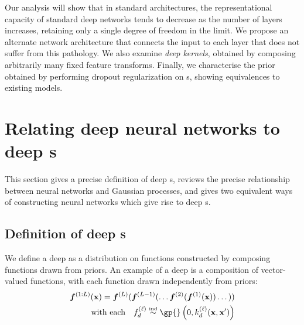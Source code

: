 \documentclass{article} %
\begin{document}
Our analysis will show that in standard architectures, the representational capacity of standard deep networks tends to decrease as the number of layers increases, retaining only a single degree of freedom in the limit.
We propose an alternate network architecture that connects the input to each layer that does not suffer from this pathology.
We also examine \emph{deep kernels}, obtained by composing arbitrarily many fixed feature transforms.
Finally, we characterise the prior obtained by performing dropout regularization on \gp{}s, showing equivalences to existing models.



\section{Relating deep neural networks to deep \sgp{}s}
\label{sec:relating}

This section gives a precise definition of deep \gp{}s, reviews the precise relationship between neural networks and Gaussian processes, and gives two equivalent ways of constructing neural networks which give rise to deep \gp{}s.



\subsection{Definition of deep \sgp{}s}

We define a deep \gp{} as a distribution on functions constructed by composing functions drawn from \gp{} priors.
An example of a deep \gp{} is a composition of vector-valued functions, with each function drawn independently from \gp{} priors:
%
\begin{align}
\vf^{(1:L)}(\vx) = \vf^{(L)}(\vf^{(L-1)}(\dots \vf^{(2)}(\vf^{(1)}(\vx)) \dots)) \\
\textnormal{with each} \quad f_d^{(\layerindex)}  \simind \gp{} \left( 0, k^{(\layerindex)}_d(\vx, \vx') \right) \nonumber
\label{eq:deep-gp}
\end{align}
%
\end{document}
